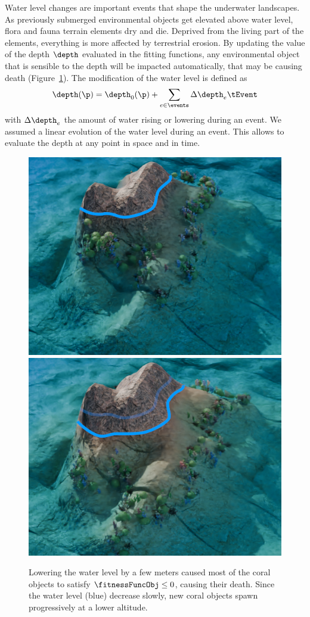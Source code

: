 Water level changes are important events that shape the underwater landscapes. As previously submerged environmental objects get elevated above water level, flora and fauna terrain elements dry and die. Deprived from the living part of the elements, everything is more affected by terrestrial erosion. By updating the value of the depth $\depth$ evaluated in the fitting functions, any environmental object that is sensible to the depth will be impacted automatically, that may be causing death (Figure~\ref{fig:semantic-representation_water-event}). The modification of the water level is defined as 
\begin{align*}
    \depth(\p) = \depth_0(\p) + \sum_{e \in \events} \Delta \depth_e \tEvent
\end{align*}
with $\Delta \depth_e$ the amount of water rising or lowering during an event. We assumed a linear evolution of the water level during an event. This allows to evaluate the depth at any point in space and in time.

\begin{figure}
    \includegraphics[width = 0.45 \linewidth]{Figures/Interactions/InteractionWater1.png}
    \includegraphics[width = 0.45 \linewidth]{Figures/Interactions/InteractionWater3.png}
    \caption{Lowering the water level by a few meters caused most of the coral objects to satisfy $\fitnessFuncObj \leq 0$, causing their death. Since the water level (blue) decrease slowly, new coral objects spawn progressively at a lower altitude.}
    \label{fig:semantic-representation_water-event}
\end{figure}

